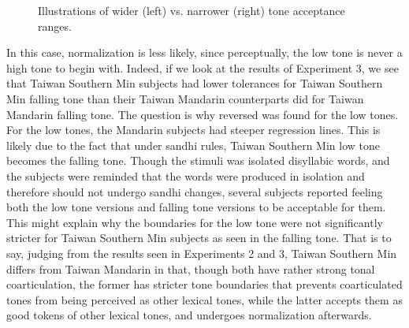 \documentclass[12pt]{report}
\begin{document}
\begin{CJK}{UTF8}{bsmi}
\begin{figure}[hbt!]
\caption{Illustrations of wider (left) vs. narrower (right) tone acceptance ranges.}
\label{Figure:ToneAcceptanceIllustration}
\end{figure}
In this case, normalization is less likely, since perceptually, the low tone is never a high tone to begin with. Indeed, if we look at the results of Experiment 3, we see that Taiwan Southern Min subjects had lower tolerances for Taiwan Southern Min falling tone than their Taiwan Mandarin counterparts did for Taiwan Mandarin falling tone. The question is why reversed was found for the low tones. For the low tones, the Mandarin subjects had steeper regression lines. This is likely due to the fact that under sandhi rules, Taiwan Southern Min low tone becomes the falling tone. Though the stimuli was isolated disyllabic words, and the subjects were reminded that the words were produced in isolation and therefore should not undergo sandhi changes, several subjects reported feeling both the low tone versions and falling tone versions to be acceptable for them. This might explain why the boundaries for the low tone were not significantly stricter for Taiwan Southern Min subjects as seen in the falling tone. That is to say, judging from the results seen in Experiments 2 and 3, Taiwan Southern Min differs from Taiwan Mandarin in that, though both have rather strong tonal coarticulation, the former has stricter tone boundaries that prevents coarticulated tones from being perceived as other lexical tones, while the latter accepts them as good tokens of other lexical tones, and undergoes normalization afterwards.


\end{CJK}
\end{document}
